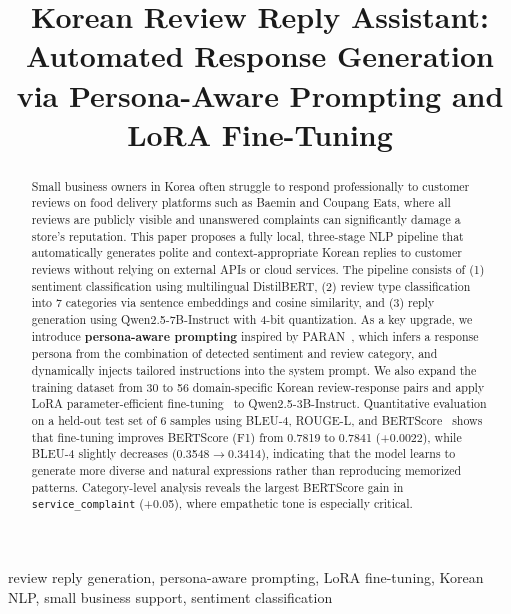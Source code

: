 \documentclass[conference]{IEEEtran}
\begin{document}
\title{Korean Review Reply Assistant:\\
Automated Response Generation via Persona-Aware Prompting and LoRA Fine-Tuning}

\author{
}

\maketitle

\begin{abstract}
Small business owners in Korea often struggle to respond professionally
to customer reviews on food delivery platforms such as Baemin and Coupang
Eats, where all reviews are publicly visible and unanswered complaints
can significantly damage a store's reputation.
This paper proposes a fully local, three-stage NLP pipeline that
automatically generates polite and context-appropriate Korean replies
to customer reviews without relying on external APIs or cloud services.
The pipeline consists of (1) sentiment classification using multilingual
DistilBERT, (2) review type classification into 7 categories via
sentence embeddings and cosine similarity, and (3) reply generation
using Qwen2.5-7B-Instruct with 4-bit quantization.
As a key upgrade, we introduce \textbf{persona-aware prompting} inspired
by PARAN~\cite{paran2024}, which infers a response persona from the
combination of detected sentiment and review category, and dynamically
injects tailored instructions into the system prompt.
We also expand the training dataset from 30 to 56 domain-specific
Korean review-response pairs and apply LoRA parameter-efficient
fine-tuning~\cite{lora2022} to Qwen2.5-3B-Instruct.
Quantitative evaluation on a held-out test set of 6 samples using
BLEU-4, ROUGE-L, and BERTScore~\cite{bertscore2020} shows that
fine-tuning improves BERTScore (F1) from 0.7819 to 0.7841 (+0.0022),
while BLEU-4 slightly decreases (0.3548$\rightarrow$0.3414), indicating
that the model learns to generate more diverse and natural expressions
rather than reproducing memorized patterns.
Category-level analysis reveals the largest BERTScore gain in
\texttt{service\_complaint} (+0.05), where empathetic tone is especially
critical.
\end{abstract}

\begin{IEEEkeywords}
review reply generation, persona-aware prompting, LoRA fine-tuning,
Korean NLP, small business support, sentiment classification
\end{IEEEkeywords}
\end{document}
